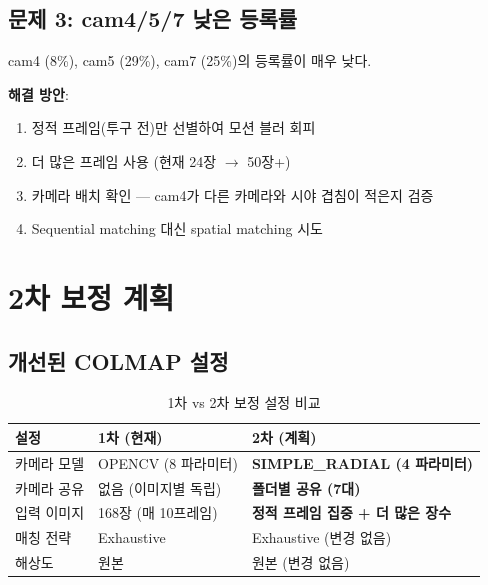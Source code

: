 \documentclass[11pt, a4paper]{report}
\begin{document}
\section{문제 3: cam4/5/7 낮은 등록률}

\begin{warningbox}
cam4 (8\%), cam5 (29\%), cam7 (25\%)의 등록률이 매우 낮다.
\end{warningbox}

\begin{nextbox}
\textbf{해결 방안}:
\begin{enumerate}[nosep]
  \item 정적 프레임(투구 전)만 선별하여 모션 블러 회피
  \item 더 많은 프레임 사용 (현재 24장 $\rightarrow$ 50장+)
  \item 카메라 배치 확인 --- cam4가 다른 카메라와 시야 겹침이 적은지 검증
  \item Sequential matching 대신 spatial matching 시도
\end{enumerate}
\end{nextbox}


\chapter{2차 보정 계획}

\section{개선된 COLMAP 설정}

\begin{table}[H]
\centering
\caption{1차 vs 2차 보정 설정 비교}
\renewcommand{\arraystretch}{1.3}
\begin{tabularx}{\textwidth}{lXX}
\toprule
\textbf{설정} & \textbf{1차 (현재)} & \textbf{2차 (계획)} \\
\midrule
카메라 모델 & OPENCV (8 파라미터) & \textbf{SIMPLE\_RADIAL (4 파라미터)} \\
카메라 공유 & 없음 (이미지별 독립) & \textbf{폴더별 공유 (7대)} \\
입력 이미지 & 168장 (매 10프레임) & \textbf{정적 프레임 집중 + 더 많은 장수} \\
매칭 전략 & Exhaustive & Exhaustive (변경 없음) \\
해상도 & 원본 & 원본 (변경 없음) \\
\bottomrule
\end{tabularx}
\end{table}
\end{document}
